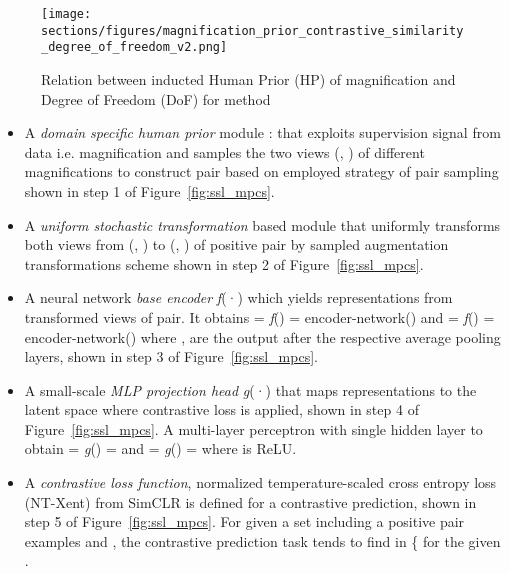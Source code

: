 \documentclass[conference]{IEEEtran}
\begin{document}
\begin{figure}[!ht]
    \centering
    \texttt{[image: sections/figures/magnification\_prior\_contrastive\_similarity\_degree\_of\_freedom\_v2.png]}
    \vspace{-0.2cm}
    \caption{Relation between inducted Human Prior (HP) of magnification and Degree of Freedom (DoF) for method}
    \label{fig:degrre_of_freedom}
    \vspace{-4mm}
\end{figure}
\begin{itemize}
    \item A \textit{domain specific human prior} module :  that exploits supervision signal from data i.e. magnification and samples the two views (\textbf{}, \textbf{}) of different magnifications to construct pair based on employed strategy of pair sampling shown in step 1 of Figure~\ref{fig:ssl_mpcs}. \vspace{-0.2cm}
    \item A \textit{uniform stochastic transformation} based module  that uniformly transforms both views from (\textbf{}, \textbf{}) to  (\textbf{}, \textbf{}) of positive pair by sampled augmentation transformations scheme shown in step 2 of Figure~\ref{fig:ssl_mpcs}.\vspace{-0.2cm}
\item  A neural network \textit{base encoder} \textit{f}(·) which yields representations from transformed views of pair. It obtains  = \textit{f}() = encoder-network() and  = \textit{f}() = encoder-network() where ,  are the output after the respective average pooling layers, shown in step 3 of Figure~\ref{fig:ssl_mpcs}.\vspace{-0.2cm}
    \item A small-scale \textit{MLP projection head} \textit{g}(·) that maps representations to the latent space where contrastive loss is applied, shown in step 4 of Figure~\ref{fig:ssl_mpcs}.
    A multi-layer perceptron with single hidden layer to obtain  = \textit{g}() =  and  = \textit{g}() =  where  is ReLU.\vspace{-0.2cm}
    \item A \textit{contrastive loss function}, normalized temperature-scaled cross entropy loss (NT-Xent) from SimCLR is defined for a contrastive prediction, shown in step 5 of Figure~\ref{fig:ssl_mpcs}.
    For given a set \textbf{} including a positive pair examples \textbf{} and \textbf{}, the contrastive prediction task tends to find \textbf{} in \{ for the given \textbf{}.
\end{itemize}
\end{document}
